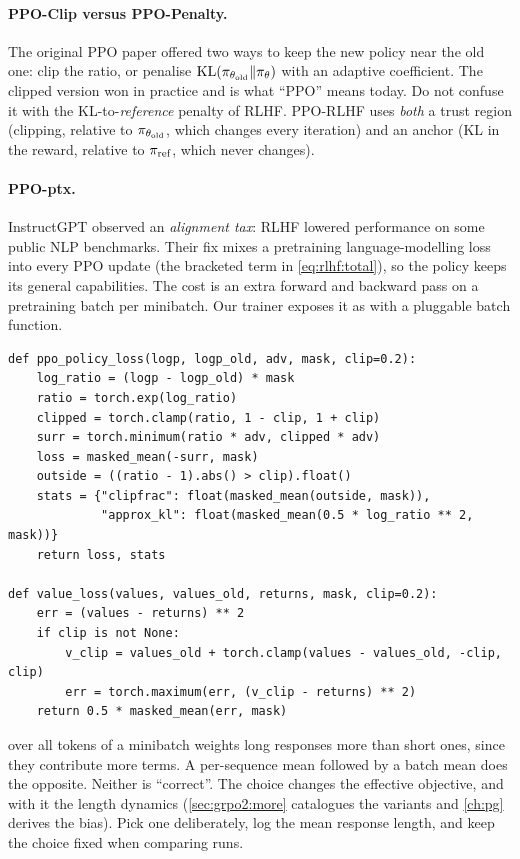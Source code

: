 \paragraph{PPO-Clip versus PPO-Penalty.} The original PPO paper offered two ways to keep the new policy near
the old one: clip the ratio, or penalise $\operatorname{KL}(\pi_{\theta_{\text{old}}}\|\pi_\theta)$ with an adaptive coefficient. The
clipped version won in practice and is what ``PPO'' means today. Do not confuse it with the
KL-to-\emph{reference} penalty of RLHF. PPO-RLHF uses \emph{both} a trust region (clipping,
relative to $\pi_{\theta_{\text{old}}}$, which changes every iteration) and an anchor (KL in the reward, relative to
$\pi_{\text{ref}}$, which never changes).

\paragraph{PPO-ptx.} InstructGPT observed an \emph{alignment tax}: RLHF lowered performance on some
public NLP benchmarks. Their fix mixes a pretraining language-modelling loss into every PPO update
(the bracketed term in \cref{eq:rlhf:total}), so the policy keeps its general capabilities. The cost is an extra
forward and backward pass on a pretraining batch per minibatch. Our trainer exposes it as
 with a pluggable batch function.

\begin{lstlisting}[caption={Clipped policy loss and clipped value loss (\ident{llmsys/rlhf/losses.py}).},label={lst:rlhf:losses}]
def ppo_policy_loss(logp, logp_old, adv, mask, clip=0.2):
    log_ratio = (logp - logp_old) * mask
    ratio = torch.exp(log_ratio)
    clipped = torch.clamp(ratio, 1 - clip, 1 + clip)
    surr = torch.minimum(ratio * adv, clipped * adv)
    loss = masked_mean(-surr, mask)
    outside = ((ratio - 1).abs() > clip).float()
    stats = {"clipfrac": float(masked_mean(outside, mask)),
             "approx_kl": float(masked_mean(0.5 * log_ratio ** 2, mask))}
    return loss, stats

def value_loss(values, values_old, returns, mask, clip=0.2):
    err = (values - returns) ** 2
    if clip is not None:
        v_clip = values_old + torch.clamp(values - values_old, -clip, clip)
        err = torch.maximum(err, (v_clip - returns) ** 2)
    return 0.5 * masked_mean(err, mask)
\end{lstlisting}

\begin{pitfall}
 over all tokens of a minibatch weights long responses more than short ones,
since they contribute more terms. A per-sequence mean followed by a batch mean does the opposite.
Neither is ``correct''. The choice changes the effective objective, and with it the length
dynamics (\cref{sec:grpo2:more} catalogues the variants and \cref{ch:pg} derives the bias).
Pick one deliberately, log the mean response length, and keep the choice fixed when comparing
runs.
\end{pitfall}

